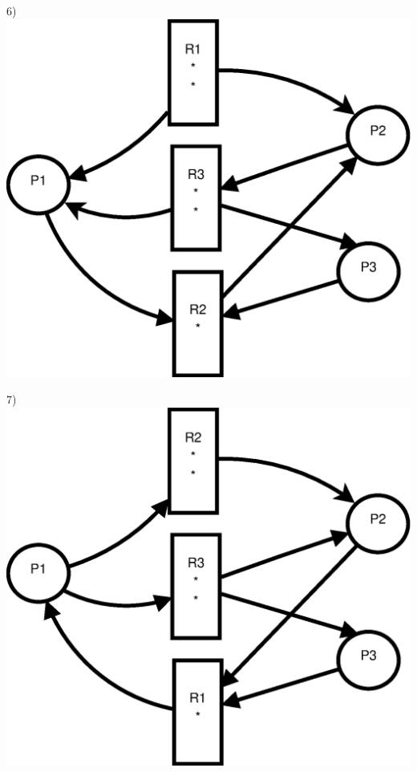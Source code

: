 \documentclass[a4paper, twoside]{article}
\begin{document}
6)\\
\includegraphics*[scale=0.60]{Ejercicio-6.eps}

7)\\
\includegraphics*[scale=0.60]{Ejercicio-7.eps}
\end{document}
